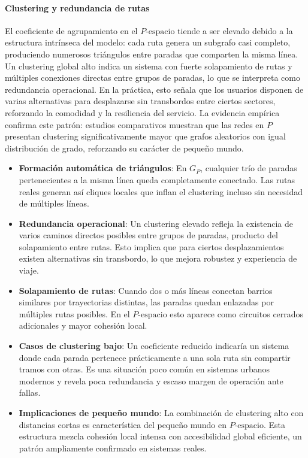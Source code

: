             \paragraph{Clustering y redundancia de rutas}
            El coeficiente de agrupamiento en el $P\text{-espacio}$ tiende a ser elevado debido a la estructura intrínseca del modelo: cada ruta genera un subgrafo casi completo, produciendo numerosos triángulos entre paradas que comparten la misma línea. Un clustering global alto indica un sistema con fuerte solapamiento de rutas y múltiples conexiones directas entre grupos de paradas, lo que se interpreta como redundancia operacional. En la práctica, esto señala que los usuarios disponen de varias alternativas para desplazarse sin transbordos entre ciertos sectores, reforzando la comodidad y la resiliencia del servicio. La evidencia empírica confirma este patrón: estudios comparativos muestran que las redes en $P$ presentan clustering significativamente mayor que grafos aleatorios con igual distribución de grado, reforzando su carácter de pequeño mundo.

            \begin{itemize}
                \item \textbf{Formación automática de triángulos}: En $G_P$, cualquier trío de paradas pertenecientes a la misma línea queda completamente conectado. Las rutas reales generan así cliques locales que inflan el clustering incluso sin necesidad de múltiples líneas.

                \item \textbf{Redundancia operacional}: Un clustering elevado refleja la existencia de varios caminos directos posibles entre grupos de paradas, producto del solapamiento entre rutas. Esto implica que para ciertos desplazamientos existen alternativas sin transbordo, lo que mejora robustez y experiencia de viaje.

                \item \textbf{Solapamiento de rutas}: Cuando dos o más líneas conectan barrios similares por trayectorias distintas, las paradas quedan enlazadas por múltiples rutas posibles. En el $P\text{-espacio}$ esto aparece como circuitos cerrados adicionales y mayor cohesión local.

                \item \textbf{Casos de clustering bajo}: Un coeficiente reducido indicaría un sistema donde cada parada pertenece prácticamente a una sola ruta sin compartir tramos con otras. Es una situación poco común en sistemas urbanos modernos y revela poca redundancia y escaso margen de operación ante fallas.

                \item \textbf{Implicaciones de pequeño mundo}: La combinación de clustering alto con distancias cortas es característica del pequeño mundo en $P\text{-espacio}$. Esta estructura mezcla cohesión local intensa con accesibilidad global eficiente, un patrón ampliamente confirmado en sistemas reales.
            \end{itemize}

